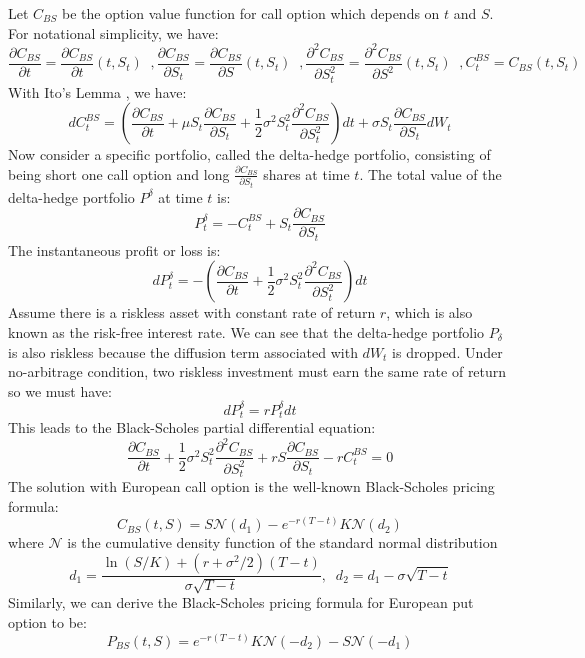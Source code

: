 \documentclass[letterpaper,12pt,titlepage,oneside,final]{book}
\numberwithin{equation}{section}
\theoremstyle{definition}
\begin{document}
Let $C_{BS}$ be the option value function for call option which depends on $t$ and $S$. 
For notational simplicity, we have:
\[
   \frac{\partial C_{BS}}{\partial t}=\frac{\partial C_{BS}}{\partial t}(t,S_t) \;\;,
   \frac{\partial C_{BS}}{\partial S_t}=\frac{\partial C_{BS}}{\partial S}(t,S_t) \;\;,
   \frac{\partial^2 C_{BS}}{\partial S_t^2}=\frac{\partial^2 C_{BS}}{\partial S^2}(t,S_t) \;\;,
   C^{BS}_t=C_{BS}(t,S_t)
\]
With Ito's Lemma \cite{shreve2004stochastic}, we have:
\[
dC^{BS}_t=\left(\frac{\partial C_{BS}}{\partial t}+\mu S_t \frac{\partial C_{BS}}{\partial S_t}+\frac{1}{2} \sigma^2 S_t^2 \frac{\partial ^2 C_{BS}}{ \partial S_t^2}\right) dt+\sigma S_t \frac{\partial C_{BS}}{\partial S_t}dW_t
\]
 Now consider a specific portfolio, called the delta-hedge portfolio, consisting of being short one call option and long $\frac{\partial C_{BS}}{\partial S_t}$ shares at time $t$.
The total value of the delta-hedge portfolio $P^{\delta}$ at time $t$ is:
\[
P^{\delta}_t=-C^{BS}_t+S_t \frac{\partial C_{BS}}{\partial S_t}
\]
The instantaneous profit or loss is:
\[
dP^{\delta}_t=-\left(\frac{\partial C_{BS}}{ \partial t} +\frac{1}{2} \sigma^2 S_t^2 \frac{\partial^2 C_{BS}}{ \partial S_t^2 } \right) dt
\]
Assume there is a riskless asset with constant rate of return $r$, which is also known as the risk-free interest rate. We can see that the delta-hedge portfolio $P_{\delta}$ is also riskless because the diffusion term associated with $dW_t$ is dropped. Under no-arbitrage condition, two riskless investment must earn the same rate of return so we must have:
\[
dP^{\delta}_{t}=rP^{\delta}_tdt
\]
This leads to the Black-Scholes partial differential equation:
\begin{equation}
\frac{\partial C_{BS}}{\partial t}+\frac{1}{2}\sigma^2 S_t^2 \frac{\partial^2 C_{BS}}{\partial S_t^2}+rS \frac{\partial C_{BS}}{\partial S_t}-rC^{BS}_t=0
\label{eq:bspde}
\end{equation}
The solution with European call option  is the well-known Black-Scholes pricing formula:
\begin{equation}
C_{BS}(t,S)=S  \mathcal{N}(d_1)-e^{-r(T-t)}  K  \mathcal{N}(d_2)
\label{eq:bs}
\end{equation}
where $\mathcal{N}$ is the cumulative density function of the standard normal distribution
\[
d_1=\frac{\ln(S/K)+(r+\sigma^2/2)(T-t)}{\sigma \sqrt{T-t}}, \;\; d_2=d_1-\sigma  \sqrt{T-t}
\]
Similarly, we can derive the Black-Scholes pricing formula for  European put option to be:
\begin{equation}
P_{BS}(t,S)=e^{-r(T-t)}  K   \mathcal{N}(-d_2)-S  \mathcal{N}(-d_1)
\label{eq:bsP}
\end{equation}
\end{document}
